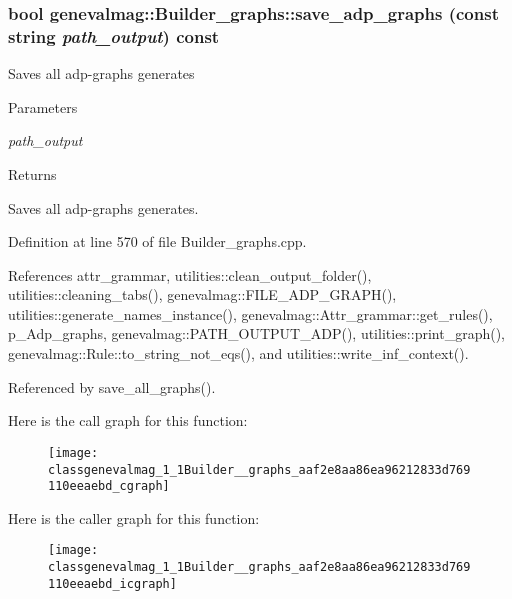 \hypertarget{classgenevalmag_1_1Builder__graphs_aaf2e8aa86ea96212833d769110eeaebd}{
\subsubsection[{save\_\-adp\_\-graphs}]{\setlength{\rightskip}{0pt plus 5cm}bool genevalmag::Builder\_\-graphs::save\_\-adp\_\-graphs (const string {\em path\_\-output}) const}}
\label{classgenevalmag_1_1Builder__graphs_aaf2e8aa86ea96212833d769110eeaebd}
Saves all adp-\/graphs generates 
\begin{DoxyParams}{Parameters}
\item[{\em path\_\-output}]\end{DoxyParams}
\begin{DoxyReturn}{Returns}

\end{DoxyReturn}
Saves all adp-\/graphs generates. 

Definition at line 570 of file Builder\_\-graphs.cpp.



References attr\_\-grammar, utilities::clean\_\-output\_\-folder(), utilities::cleaning\_\-tabs(), genevalmag::FILE\_\-ADP\_\-GRAPH(), utilities::generate\_\-names\_\-instance(), genevalmag::Attr\_\-grammar::get\_\-rules(), p\_\-Adp\_\-graphs, genevalmag::PATH\_\-OUTPUT\_\-ADP(), utilities::print\_\-graph(), genevalmag::Rule::to\_\-string\_\-not\_\-eqs(), and utilities::write\_\-inf\_\-context().



Referenced by save\_\-all\_\-graphs().



Here is the call graph for this function:\nopagebreak
\begin{figure}[H]
\begin{center}
\leavevmode
\texttt{[image: classgenevalmag\_1\_1Builder\_\_graphs\_aaf2e8aa86ea96212833d769110eeaebd\_cgraph]}
\end{center}
\end{figure}




Here is the caller graph for this function:\nopagebreak
\begin{figure}[H]
\begin{center}
\leavevmode
\texttt{[image: classgenevalmag\_1\_1Builder\_\_graphs\_aaf2e8aa86ea96212833d769110eeaebd\_icgraph]}
\end{center}
\end{figure}


